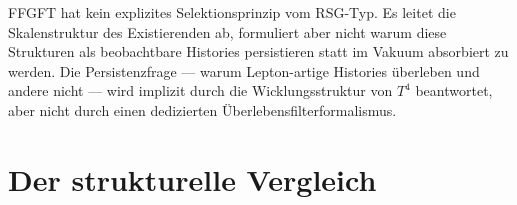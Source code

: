FFGFT hat kein explizites Selektionsprinzip vom RSG-Typ. Es leitet die
Skalenstruktur des Existierenden ab, formuliert aber nicht warum diese
Strukturen als beobachtbare Histories persistieren statt im Vakuum
absorbiert zu werden. Die Persistenzfrage — warum Lepton-artige Histories
überleben und andere nicht — wird implizit durch die Wicklungsstruktur von
$T^4$ beantwortet, aber nicht durch einen dedizierten Überlebensfilterformalismus.

\section{Der strukturelle Vergleich}

